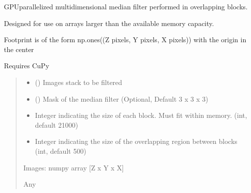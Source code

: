 \documentclass[letterpaper,10pt,english]{sphinxmanual}
\begin{document}
\begin{fulllineitems}
\label{\detokenize{ImageProcessing:ImageProcessing.blockwise_fast_filter_tiff}}
\pysigstartsignatures
{}
\pysigstopsignatures
\sphinxAtStartPar
GPU\sphinxhyphen{}parallelized multidimensional median filter performed in overlapping blocks.

\sphinxAtStartPar
Designed for use on arrays larger than the available memory capacity.

\sphinxAtStartPar
Footprint is of the form np.ones((Z pixels, Y pixels, X pixels)) with the origin in the center

\sphinxAtStartPar
Requires CuPy
\begin{quote}\begin{description}
\begin{itemize}
\item {} 
\sphinxAtStartPar
{} () \textendash{} Images stack to be filtered

\item {} 
\sphinxAtStartPar
{} () \textendash{} Mask of the median filter (Optional, Default 3 x 3 x 3)

\item {} 
\sphinxAtStartPar
{} \textendash{} Integer indicating the size of each block. Must fit within memory. (int, default 21000)

\item {} 
\sphinxAtStartPar
{} \textendash{} Integer indicating the size of the overlapping region between blocks (int, default 500)

\end{itemize}

\sphinxAtStartPar
Images: numpy array {[}Z x Y x X{]}

\sphinxAtStartPar
Any

\end{description}\end{quote}

\end{fulllineitems}
\end{document}
